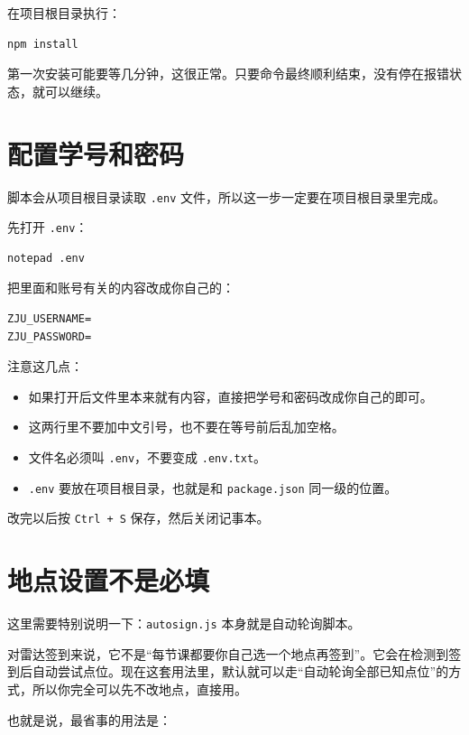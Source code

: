 \documentclass[UTF8,12pt]{ctexart}
\begin{document}
\noindent 在项目根目录执行：

\begin{verbatim}
npm install
\end{verbatim}

\noindent 第一次安装可能要等几分钟，这很正常。只要命令最终顺利结束，没有停在报错状态，就可以继续。

\section{配置学号和密码}

\noindent 脚本会从项目根目录读取 \texttt{.env} 文件，所以这一步一定要在项目根目录里完成。

\noindent 先打开 \texttt{.env}：

\begin{verbatim}
notepad .env
\end{verbatim}

\noindent 把里面和账号有关的内容改成你自己的：

\begin{verbatim}
ZJU_USERNAME=
ZJU_PASSWORD=
\end{verbatim}

\noindent 注意这几点：

\begin{itemize}
  \item 如果打开后文件里本来就有内容，直接把学号和密码改成你自己的即可。
  \item 这两行里不要加中文引号，也不要在等号前后乱加空格。
  \item 文件名必须叫 \texttt{.env}，不要变成 \texttt{.env.txt}。
  \item \texttt{.env} 要放在项目根目录，也就是和 \texttt{package.json} 同一级的位置。
\end{itemize}

\noindent 改完以后按 \texttt{Ctrl + S} 保存，然后关闭记事本。

\section{地点设置不是必填}

\noindent 这里需要特别说明一下：\texttt{autosign.js} 本身就是自动轮询脚本。

\noindent 对雷达签到来说，它不是“每节课都要你自己选一个地点再签到”。它会在检测到签到后自动尝试点位。现在这套用法里，默认就可以走“自动轮询全部已知点位”的方式，所以你完全可以先不改地点，直接用。

\noindent 也就是说，最省事的用法是：
\end{document}
